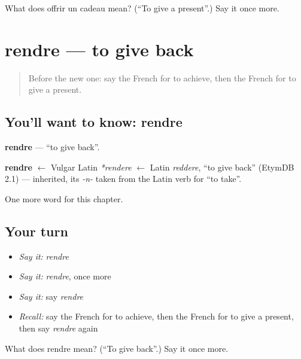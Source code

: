 \begin{tcolorbox}[breakable,colback=teal!4,colframe=teal!35!black,title={Before you move on}]
What does offrir un cadeau mean? (\textquotedblleft{}To give a present\textquotedblright{}.) Say it once more.
\end{tcolorbox}
\section[rendre]{rendre — to give back}

\label{lesson:FR-C210-rendre}



\begin{quote}
Before the new one: say the French for to achieve, then the French for to give a present.
\end{quote}

\subsection*{You'll want to know: rendre}
\textbf{rendre} — \textquotedblleft{}to give back\textquotedblright{}.

\begin{cousinweb}
\textbf{rendre} $\leftarrow$ Vulgar Latin \emph{*rendere} $\leftarrow$ Latin \emph{reddere}, \textquotedblleft{}to give back\textquotedblright{} (EtymDB 2.1) — inherited, its \emph{-n-} taken from the Latin verb for \textquotedblleft{}to take\textquotedblright{}.
\end{cousinweb}

\begin{grammarlens}[title={What you've built}]
One more word for this chapter.
\end{grammarlens}

\subsection*{Your turn}
\begin{itemize}
\raggedright
  \item \emph{Say it:} \emph{rendre}
  \item \emph{Say it:} \emph{rendre}, once more
  \item \emph{Say it:} say \emph{rendre}
  \item \emph{Recall:} say the French for to achieve, then the French for to give a present, then say \emph{rendre} again
\end{itemize}

\begin{tcolorbox}[breakable,colback=teal!4,colframe=teal!35!black,title={Before you move on}]
What does rendre mean? (\textquotedblleft{}To give back\textquotedblright{}.) Say it once more.
\end{tcolorbox}
